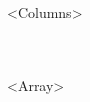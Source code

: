 \begin{<fontsize:normalsize>}
\begin{longtable}{<Columns>}
\caption{<Caption:nameless table>} \\
\label{<Label>} \\
<Array>
\end{longtable}
\end{<fontsize:normalsize>}